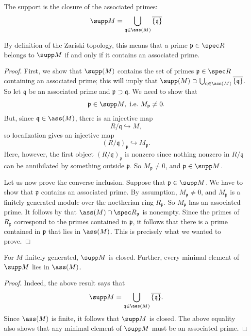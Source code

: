 \begin{proposition}\label{supportassociated} The support is the closure of the associated primes:
\[ \supp M  = \bigcup_{\mathfrak{q} \in \ass(M)}
\overline{\left\{\mathfrak{q}\right\}} \]
\end{proposition} 

By definition of the Zariski topology, this means that a prime $\mathfrak{p}
\in \spec R$ belongs to $\supp M$ if and only if it contains an associated
prime. 

\begin{proof} 
First,  we show that $\supp(M)$ contains the set of primes
$\mathfrak{p} \in \spec R$ containing an associated prime; this will imply
that $\supp(M) \supset \bigcup_{\mathfrak{q} \in \ass(M)}
\overline{\left\{\mathfrak{q}\right\}}$. So let $\mathfrak{q}$ be an
associated prime and $\mathfrak{p} \supset \mathfrak{q}$. We need to show that
\[ \mathfrak{p} \in \supp M, \ \text{i.e.} \ M_{\mathfrak{p}} \neq 0.  \]
But, since $\mathfrak{q} \in \ass(M)$,  there is an injective map
\[ R/\mathfrak{q} \hookrightarrow M , \]
so localization gives an injective map
\[ (R/\mathfrak{q})_{\mathfrak{p}} \hookrightarrow M_{\mathfrak{p}}.  \]
Here, however, the first object $(R/\mathfrak{q})_{\mathfrak{p}}$ is nonzero since nothing nonzero in $R/\mathfrak{q}$ can be
annihilated by something outside $\mathfrak{p}$. So $M_{\mathfrak{p}} \neq
0$, and $\mathfrak{p} \in \supp M$. 

Let us now prove the converse inclusion. Suppose that $\mathfrak{p} \in \supp M$. We
have to show that $\mathfrak{p}$ contains an associated prime.  
By assumption, $M_{\mathfrak{p}} \neq 0$, and $M_{\mathfrak{p}}$ is a finitely generated
module over the noetherian ring $R_{\mathfrak{p}}$. So $M_{\mathfrak{p}}$ has
an associated prime.
It follows by  that $\ass(M) \cap \spec
R_{\mathfrak{p}}$ is nonempty. Since the primes of $R_{\mathfrak{p}}$
correspond to the primes contained in $\mathfrak{p}$, it follows that there
is  a prime contained in $\mathfrak{p}$ that lies in $\ass(M)$. This is
precisely what we wanted to prove.
\end{proof} 


\begin{corollary} \label{suppisclosed} For $M$ finitely generated,  
$\supp M$ is closed. Further, every minimal element of $\supp M$ lies in
$\ass(M)$.
\end{corollary} 
\begin{proof} 
Indeed, the above result says that
\[ \supp M  = \bigcup_{\mathfrak{q} \in \ass(M)}
\overline{\left\{\mathfrak{q}\right\}}. \]
Since $\ass(M)$ is finite, it follows that $\supp M$ is closed.
The above equality also shows that any minimal element of $\supp M$ must be an
associated prime.
\end{proof} 

